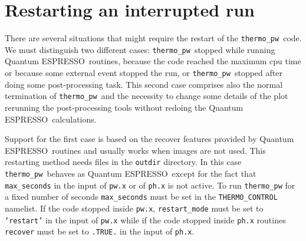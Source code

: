 \documentclass[12pt,a4paper]{article}
\def\qe{{\sc Quantum ESPRESSO}}
\def\thermo{\texttt{thermo\_pw}}
\begin{document}
%
%

\newpage
\section{\color{coral}Restarting an interrupted run}

There are several situations that might require the restart of the \thermo\ 
code. We must distinguish two different cases:
\thermo\ stopped while running \qe\ routines, because the code reached
the maximum cpu time or because some external event stopped the run,
or \thermo\ stopped after doing some post-processing task. This second 
case comprises also the normal termination of
\thermo\ and the necessity to change some details of the plot rerunning
the post-processing tools without redoing the \qe\ calculations.

Support for the first case is based on the recover features provided by 
\qe\ routines and usually works when images are not used. This restarting 
method needs files in the \texttt{outdir}
directory. In this case \thermo\ behaves as \qe\ 
except for the fact that \texttt{max\_seconds} in the input of \texttt{pw.x} or
of \texttt{ph.x} is not active. To run \texttt{thermo\_pw}
for a fixed number of seconds \texttt{max\_seconds} must be set in the
\texttt{THERMO\_CONTROL} namelist. If the code stopped inside \texttt{pw.x},
\texttt{restart\_mode} must be set to \texttt{'restart'} in the input of 
\texttt{pw.x} while if the code stopped inside \texttt{ph.x} routines
\texttt{recover} must be set to \texttt{.TRUE.} in the input of \texttt{ph.x}.
\end{document}
